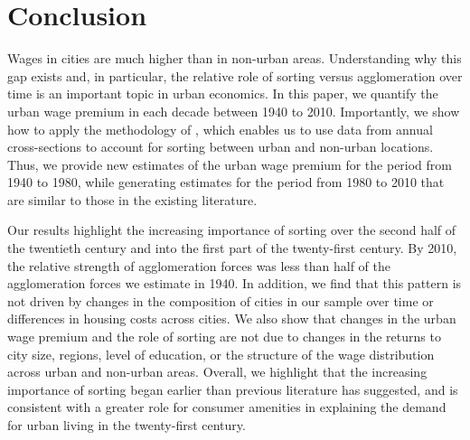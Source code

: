 \documentclass[12pt]{article}
\begin{document}
\section{Conclusion}

Wages in cities are much higher than in non-urban areas.
Understanding why this gap exists and, in particular, the relative role of sorting versus agglomeration over time is an important topic in urban economics.
In this paper, we quantify the urban wage premium in each decade between 1940 to 2010.
Importantly, we show how to apply the methodology of \citet{altonji2018estimating}, which enables us to use data from annual cross-sections to account for sorting between urban and non-urban locations.
Thus, we provide new estimates of the urban wage premium for the period from 1940 to 1980, while generating estimates for the period from 1980 to 2010 that are similar to those in the existing literature. 

Our results highlight the increasing importance of sorting over the second half of the twentieth century and into the first part of the twenty-first century.
By 2010, the relative strength of agglomeration forces was less than half of the agglomeration forces we estimate in 1940.
In addition, we find that this pattern is not driven by changes in the composition of cities in our sample over time or differences in housing costs across cities.
We also show that changes in the urban wage premium and the role of sorting are not due to changes in the returns to city size, regions, level of education, or the structure of the wage distribution across urban and non-urban areas.
Overall, we highlight that the increasing importance of sorting began earlier than previous literature has suggested, and is consistent with a greater role for consumer amenities in explaining the demand for urban living in the twenty-first century.

\clearpage

\setlength{\bibsep}{.01in}

\begin{onehalfspacing}

\end{onehalfspacing}


\clearpage\newpage
\end{document}
